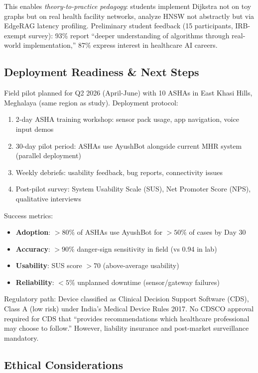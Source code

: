 \documentclass[conference,compsoc]{IEEEtran}
\begin{document}
This enables \textit{theory-to-practice pedagogy}: students implement Dijkstra not on toy graphs but on real health facility networks, analyze HNSW not abstractly but via EdgeRAG latency profiling. Preliminary student feedback (15 participants, IRB-exempt survey): 93\% report ``deeper understanding of algorithms through real-world implementation,'' 87\% express interest in healthcare AI careers.

\subsection{Deployment Readiness \& Next Steps}

Field pilot planned for Q2 2026 (April-June) with 10 ASHAs in East Khasi Hills, Meghalaya (same region as \cite{meghalaya_asha_2025} study). Deployment protocol:
\begin{enumerate}
    \item 2-day ASHA training workshop: sensor pack usage, app navigation, voice input demos
    \item 30-day pilot period: ASHAs use AyushBot alongside current MHR system (parallel deployment)
    \item Weekly debriefs: usability feedback, bug reports, connectivity issues
    \item Post-pilot survey: System Usability Scale (SUS), Net Promoter Score (NPS), qualitative interviews
\end{enumerate}

Success metrics:
\begin{itemize}
    \item \textbf{Adoption}: \(>80\%\) of ASHAs use AyushBot for \(>50\%\) of cases by Day 30
    \item \textbf{Accuracy}: \(>90\%\) danger-sign sensitivity in field (vs 0.94 in lab)
    \item \textbf{Usability}: SUS score \(>70\) (above-average usability)
    \item \textbf{Reliability}: \(<5\%\) unplanned downtime (sensor/gateway failures)
\end{itemize}

Regulatory path: Device classified as Clinical Decision Support Software (CDS), Class A (low risk) under India's Medical Device Rules 2017. No CDSCO approval required for CDS that ``provides recommendations which healthcare professional may choose to follow.'' However, liability insurance and post-market surveillance mandatory.

\subsection{Ethical Considerations}
\end{document}
